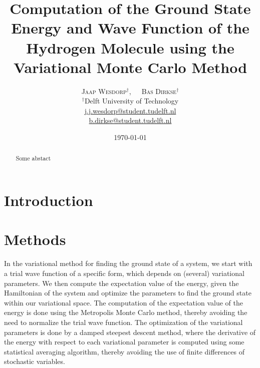 \documentclass[twoside]{article}
\title{\vspace{-15mm}\fontsize{18pt}{10pt}\selectfont\textbf{Computation of the Ground State Energy and Wave Function of the Hydrogen Molecule using the Variational Monte Carlo Method}} %
\author{
	\large
	\textsc{Jaap Wesdorp}$^\dagger$, $\hspace{10pt}$ \textsc{Bas Dirkse}$^\dagger$ \\ %
	\normalsize $^\dagger$Delft University of Technology \\ %
	\normalsize \href{mailto:j.j.wesdorp@student.tudelft.nl}{j.j.wesdorp@student.tudelft.nl} \\
	\normalsize \href{mailto:b.dirkse@student.tudelft.nl}{b.dirkse@student.tudelft.nl} 
}
\date{\today\vspace{-8mm}}
\begin{document}


\maketitle %
\thispagestyle{firststyle} %


\begin{abstract}
\noindent  
Some abstact

	
\end{abstract}


\section{Introduction}
\lipsum[1]


\section{Methods}
In the variational method for finding the ground state of a system, we start with a trial wave function of a specific form, which depends on (several) variational parameters. We then compute the expectation value of the energy, given the Hamiltonian of the system and optimize the parameters to find the ground state within our variational space. The computation of the expectation value of the energy is done using the Metropolis Monte Carlo method, thereby avoiding the need to normalize the trial wave function. The optimization of the variational parameters is done by a damped steepest descent method, where the derivative of the energy with respect to each variational parameter is computed using some statistical averaging algorithm, thereby avoiding the use of finite differences of stochastic variables. 
\end{document}
